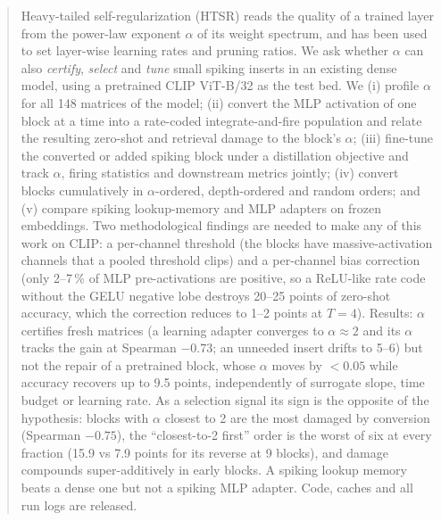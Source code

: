 \begin{abstract}
Heavy-tailed self-regularization (HTSR) reads the quality of a trained layer from the power-law exponent $\alpha$ of its weight spectrum, and has been used to set layer-wise learning rates and pruning ratios. We ask whether $\alpha$ can also \emph{certify}, \emph{select} and \emph{tune} small spiking inserts in an existing dense model, using a pretrained CLIP ViT-B/32 as the test bed. We (i) profile $\alpha$ for all 148 matrices of the model; (ii) convert the MLP activation of one block at a time into a rate-coded integrate-and-fire population and relate the resulting zero-shot and retrieval damage to the block's $\alpha$; (iii) fine-tune the converted or added spiking block under a distillation objective and track $\alpha$, firing statistics and downstream metrics jointly; (iv) convert blocks cumulatively in $\alpha$-ordered, depth-ordered and random orders; and (v) compare spiking lookup-memory and MLP adapters on frozen embeddings. Two methodological findings are needed to make any of this work on CLIP: a per-channel threshold (the blocks have massive-activation channels that a pooled threshold clips) and a per-channel bias correction (only 2--7\,\% of MLP pre-activations are positive, so a ReLU-like rate code without the GELU negative lobe destroys 20--25 points of zero-shot accuracy, which the correction reduces to 1--2 points at $T{=}4$). Results: $\alpha$ certifies fresh matrices (a learning adapter converges to $\alpha\approx2$ and its $\alpha$ tracks the gain at Spearman $-0.73$; an unneeded insert drifts to 5--6) but not the repair of a pretrained block, whose $\alpha$ moves by $<0.05$ while accuracy recovers up to 9.5 points, independently of surrogate slope, time budget or learning rate. As a selection signal its sign is the opposite of the hypothesis: blocks with $\alpha$ closest to 2 are the most damaged by conversion (Spearman $-0.75$), the ``closest-to-2 first'' order is the worst of six at every fraction (15.9 vs 7.9 points for its reverse at 9 blocks), and damage compounds super-additively in early blocks. A spiking lookup memory beats a dense one but not a spiking MLP adapter. Code, caches and all run logs are released.
\end{abstract}
